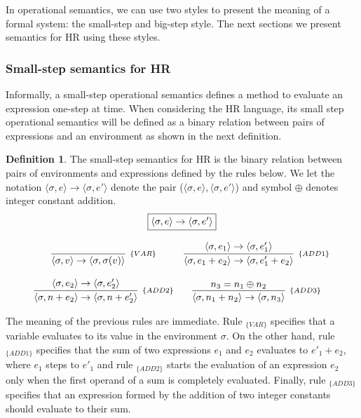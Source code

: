 \documentclass[oneside,12pt]{scrbook}
\theoremstyle{definition}
\theoremstyle{plain}
\theoremstyle{definition}
\newtheorem{Definition}{Definition}
\begin{document}
In operational semantics, we can use two styles to present the meaning of a formal system: the small-step and
big-step style. The next sections we present semantics for HR using these styles.

\subsubsection{Small-step semantics for HR}\label{subsubsection:small-step}

Informally, a small-step operational semantics defines a method to evaluate an expression one-step at time. When considering the HR language, its small step operational semantics will be defined as
a binary relation between pairs of expressions and an environment as shown in the next definition.

\begin{Definition}
   The small-step semantics for HR is the binary relation between pairs of environments and
   expressions defined by the rules below. We let the notation
   $\langle \sigma, e \rangle \to \langle \sigma, e' \rangle$ denote the pair
   ($\langle \sigma, e \rangle , \langle \sigma, e' \rangle$) and symbol $\oplus$ denotes
   integer constant addition.
   \[
      \begin{array}{c}
        \fbox{$\langle \sigma, e \rangle \to \langle \sigma, e' \rangle$} \\  \\
         \begin{array}{cc}
           \infer[_{\{VAR\}}]
                 {\langle \sigma, v \rangle \to \langle \sigma, \sigma(v)\rangle}{} &
           \infer[_{\{ADD1\}}]
                 {\langle \sigma, e_1 + e_2\rangle \to \langle \sigma, e'_1 + e_2 \rangle}
                 {\langle \sigma, e_1\rangle \to \langle \sigma, e'_1\rangle} \\ \\
           \infer[_{\{ADD2\}}]
                 {\langle \sigma, n + e_2 \rangle \to \langle \sigma , n + e'_2\rangle}
                 {\langle \sigma, e_2 \rangle \to \langle \sigma, e'_2 \rangle} &
           \infer[_{\{ADD3\}}]
                 {\langle \sigma, n_1 + n_2 \rangle \to \langle \sigma, n_3 \rangle}
                 {n_3 = n_1 \oplus n_2}
         \end{array}
       \end{array}
   \]
\end{Definition}

The meaning of the previous rules are immediate. Rule $_{\{VAR\}}$ specifies that a variable evaluates
to its value in the environment $\sigma$. On the other hand, rule $_{\{ADD1\}}$ specifies that the sum
of two expressions $e_1$ and $e_2$ evaluates to $e'_1 + e_2$, where $e_1$ steps to $e'_1$ and rule
$_{\{ADD2\}}$ starts the evaluation of an expression $e_2$ only when the first operand of a sum is
completely evaluated. Finally, rule $_{\{ADD3\}}$ specifies that an expression formed by the addition of two
integer constants should evaluate to their sum. 
\end{document}
